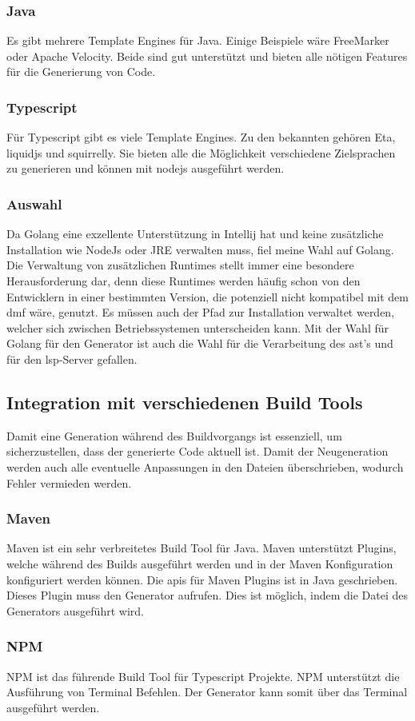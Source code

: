 \documentclass[./einleitung.tex]{subfiles}
\begin{document}
\subsubsection{Java}
Es gibt mehrere Template Engines für Java.
Einige Beispiele wäre FreeMarker oder Apache Velocity.
Beide sind gut unterstützt und bieten alle nötigen Features für die Generierung von Code.

\subsubsection{Typescript}
Für Typescript gibt es viele Template Engines.
Zu den bekannten gehören Eta, liquidjs und squirrelly.
Sie bieten alle die Möglichkeit verschiedene Zielsprachen zu generieren und können mit nodejs ausgeführt werden.

\subsubsection{Auswahl}
Da Golang eine exzellente Unterstützung in Intellij hat und keine zusätzliche Installation wie NodeJs oder JRE verwalten muss, fiel meine Wahl auf Golang.
Die Verwaltung von zusätzlichen Runtimes stellt immer eine besondere Herausforderung dar, denn diese Runtimes werden häufig schon von den Entwicklern in einer bestimmten Version, die potenziell nicht kompatibel mit dem \acrshort{dmf} wäre, genutzt.
Es müssen auch der Pfad zur Installation verwaltet werden, welcher sich zwischen Betriebssystemen unterscheiden kann.
\newline
Mit der Wahl für Golang für den Generator ist auch die Wahl für die Verarbeitung des \acrshort{ast}'s und für den \acrlong{lsp}-Server gefallen.

\subsection{Integration mit verschiedenen Build Tools}
Damit eine Generation während des Buildvorgangs ist essenziell, um sicherzustellen, dass der generierte Code aktuell ist.
Damit der Neugeneration werden auch alle eventuelle Anpassungen in den Dateien überschrieben, wodurch Fehler vermieden werden.

\subsubsection{Maven}
Maven ist ein sehr verbreitetes Build Tool für Java.
Maven unterstützt Plugins, welche während des Builds ausgeführt werden und in der Maven Konfiguration konfiguriert werden können.
Die \acrlong{api}s für Maven Plugins ist in Java geschrieben.
Dieses Plugin muss den Generator aufrufen.
Dies ist möglich, indem die Datei des Generators ausgeführt wird.

\subsubsection{NPM}
NPM ist das führende Build Tool für Typescript Projekte.
NPM unterstützt die Ausführung von Terminal Befehlen.
Der Generator kann somit über das Terminal ausgeführt werden.

\end{document}
